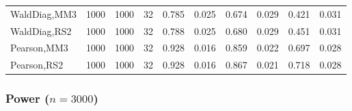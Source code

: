 \documentclass[
]{article}
\begin{document}
\begin{table}[H]
{\begin{tabular}[t]{lrrrrrrlrr}
\hspace{1em}WaldDiag,MM3 & 1000 & 1000 & 32 & 0.785 & 0.025 & 0.674 & 0.029 & 0.421 & 0.031\\
\hspace{1em}WaldDiag,RS2 & 1000 & 1000 & 32 & 0.788 & 0.025 & 0.680 & 0.029 & 0.451 & 0.031\\
\hspace{1em}Pearson,MM3 & 1000 & 1000 & 32 & 0.928 & 0.016 & 0.859 & 0.022 & 0.697 & 0.028\\
\hspace{1em}Pearson,RS2 & 1000 & 1000 & 32 & 0.928 & 0.016 & 0.867 & 0.021 & 0.718 & 0.028\\
\bottomrule
\end{tabular}}
\endgroup{}
\end{table}

\hypertarget{power-n3000-1}{%
\subsubsection{\texorpdfstring{Power
(\(n=3000\))}{Power (n=3000)}}\label{power-n3000-1}}
\end{document}
